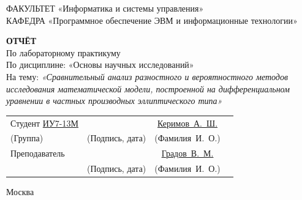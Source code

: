 \begin{titlepage}
	{\doublespacing\small\raggedright
		ФАКУЛЬТЕТ \hspace{28mm} «Информатика и системы управления» \\
		КАФЕДРА \hspace{9mm} «Программное обеспечение ЭВМ и информационные технологии» \\
	}

	\vspace{20mm}

	{\large\bfseries ОТЧЁТ} \\
	По лабораторному практикуму \\
	По дисциплине: «Основы научных исследований» \\
	На тему:
	{\itshape
		«Сравнительный анализ разностного и вероятностного методов исследования математической модели, построенной на дифференциальном уравнении в частных производных эллиптического типа»
	}

	\vfill

	\begin{tabular}{p{} c c c}
		Студент \underline{ИУ7-13М}            & \underline{\hspace{35mm}}     & \underline{Керимов~А.~Ш.}     \\ [-0.6em]
		{\hspace{23.5mm} \scriptsize (Группа)} & {\scriptsize (Подпись, дата)} & {\scriptsize (Фамилия~И.~О.)} \\
		Преподаватель                   & \underline{\hspace{35mm}}     & \underline{Градов~В.~М.}      \\ [-0.6em]
		& {\scriptsize (Подпись, дата)} & {\scriptsize (Фамилия~И.~О.)} \\
	\end{tabular}

	\vspace{15mm}

	Москва {\the\year}
\end{titlepage}

\setcounter{page}{2}
